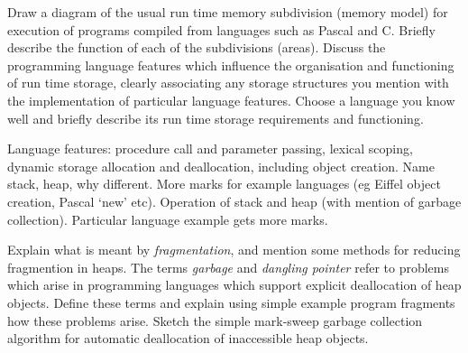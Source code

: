 \begin{questions}
\begin{subquestions}
\end{subquestions}

\question

\begin{subquestions}
\subquestion
Draw a diagram of the usual run time memory
subdivision (memory model) for execution of
programs compiled from languages such as
Pascal and C.  
Briefly describe the function of each
of the subdivisions (areas).
Discuss the programming language features which influence
the organisation and functioning of run time storage,
clearly associating any storage structures you
mention with the implementation of particular language features.
Choose a language you know well and briefly describe
its run time storage requirements and functioning.
\begin{modelanswer}
Language features: procedure call and parameter passing,
lexical scoping, dynamic storage allocation and deallocation,
including object creation. Name stack, heap, why different.
More marks for example languages
(eg Eiffel object creation, Pascal `new' etc). Operation of
stack and heap (with mention of garbage collection).
Particular language example gets more marks.
\end{modelanswer}

\subquestion
Explain what is 
meant by {\em fragmentation}, and mention some methods
for reducing fragmention in heaps.  The terms
{\em garbage\/} and {\em dangling pointer} refer to
problems which arise in programming languages which
support explicit deallocation of heap objects. Define
these terms and explain using simple example program
fragments how these problems arise.
Sketch the simple mark-sweep garbage collection algorithm
for automatic deallocation of inaccessible heap objects.

\subquestion


\end{subquestions}
\end{questions}
